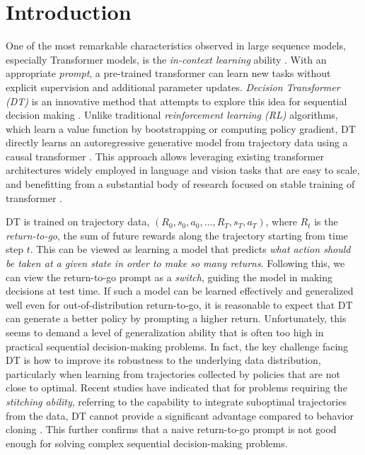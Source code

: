 
\section{Introduction}


One of the most remarkable characteristics observed in large sequence models, especially Transformer models, is the \emph{in-context learning} ability \citep{radford2019language,brown2020language,ramesh2021zero,gao2020making,akyurek2022learning,garg2022can,laskin2022context,lee2023supervised}. 
With an appropriate \emph{prompt}, a pre-trained transformer can learn new tasks without explicit supervision and additional parameter updates. 
\emph{Decision Transformer (DT)} is an innovative method that attempts to explore this idea for sequential decision making \citep{chen2021decision}.  
Unlike traditional \emph{reinforcement learning (RL)} algorithms, which learn a value function by bootstrapping or computing policy gradient, 
DT directly learns an autoregressive generative model from trajectory data using a causal transformer \citep{vaswani2017attention,radford2019language}.  
This approach allows leveraging existing transformer architectures widely employed in language and vision tasks that are easy to scale, and benefitting from a substantial body of research focused on stable training of transformer  \citep{radford2019language,brown2020language,fedus2022switch,chowdhery2022palm}.


DT is trained on trajectory data, 
$(R_0, s_0, a_0, \dots, R_T, s_T, a_T)$, where $R_t$ is the \emph{return-to-go}, the sum of future rewards along the trajectory starting from time step $t$.  
This can be viewed as learning a model that predicts \emph{what action should be taken at a given state in order to make so many returns}.  Following this, we can view the return-to-go prompt as a \emph{switch}, guiding the model in making decisions at test time. 
If such a model can be learned effectively and generalized well even for out-of-distribution return-to-go, it is reasonable to expect that DT can generate a better policy by prompting a higher return.  
Unfortunately, this seems to demand a level of generalization ability that is often too high in practical sequential decision-making problems.   
In fact, the key challenge facing DT is how to improve its robustness to the underlying data distribution, particularly when learning from trajectories collected by policies that are not close to optimal.  
Recent studies have indicated that for problems requiring the \emph{stitching ability}, referring to the capability to integrate suboptimal trajectories from the data, DT cannot provide a significant advantage compared to behavior cloning \citep{fujimoto2021minimalist,emmons2021rvs,kostrikov2022offline,yamagata2023q,badrinath2023waypoint,xiao2023sample}. 
This further confirms that a naive return-to-go prompt is not good enough for solving complex sequential decision-making problems. 

